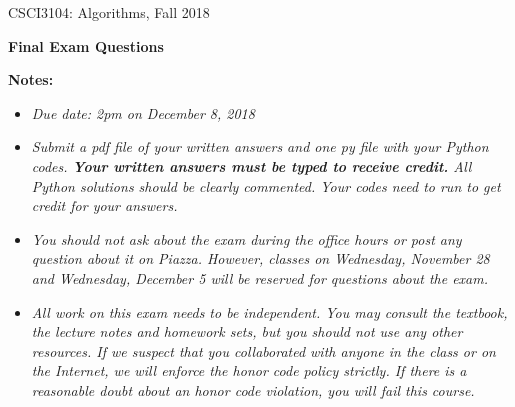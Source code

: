 \documentclass[12pt]{article}
\begin{document}
\begin{center}
{\large CSCI3104: Algorithms, Fall 2018}

\vspace{5mm}
{\bf \Large Final Exam Questions}

\vspace{6mm}
\end{center}

\noindent
{\bf Notes:}
\begin{itemize}
\item {\em Due date: 2pm on December 8, 2018}
\vspace{-2mm}
\item {\em Submit a pdf file of your written answers and one py file with your Python codes. \textbf{Your written answers must be typed to receive credit.} All Python solutions should be clearly commented. Your codes need to run to get credit for your answers.}
\vspace{-2mm}
\item {\em You should not ask about the exam during the office hours or post any question about it on Piazza. However, classes on Wednesday, November 28 and Wednesday, December 5 will be reserved for questions about the exam.}
\vspace{-2mm}
\item {\em All work on this exam needs to be independent. You may consult the textbook, the lecture notes and homework sets, but you should not use any other resources. If we suspect that you collaborated with anyone in the class or on the Internet, we will enforce the honor code policy strictly. If there is a reasonable doubt about an honor code violation,  you will fail this course.}
\end{itemize}
\end{document}
